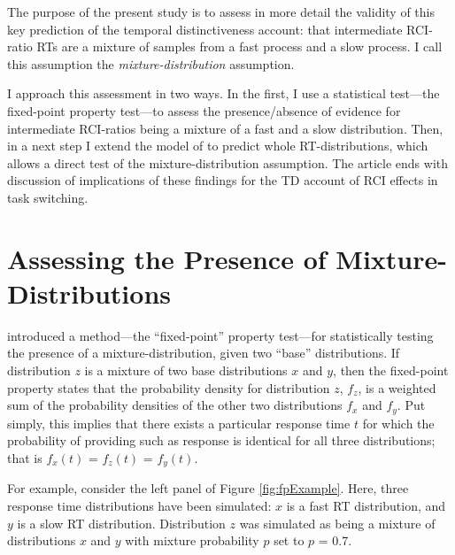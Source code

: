 \documentclass[a4paper, jou, natbib]{apa6}
\begin{document}
The purpose of the present study is to assess in more detail the validity of this key prediction of the temporal distinctiveness account: that intermediate RCI-ratio RTs are a mixture of samples from a fast process and a slow process. I call this assumption the \emph{mixture-distribution} assumption. 

I approach this assessment in two ways. In the first, I use a statistical test---the fixed-point property test---to assess the presence/absence of evidence for intermediate RCI-ratios being a mixture of a fast and a slow distribution. Then, in a next step I extend the model of \cite{Grange2015} to predict whole RT-distributions, which allows a direct test of the mixture-distribution assumption. The article ends with discussion of implications of these findings for the TD account of RCI effects in task switching.

\section{Assessing the Presence of Mixture-Distributions}
\cite{VanMaanen2014} introduced a method---the ``fixed-point'' property test---for statistically testing the presence of a mixture-distribution, given two ``base'' distributions. If distribution $z$ is a mixture of two base distributions $x$ and $y$, then the fixed-point property states that the probability density for distribution $z$, $f_{z}$, is a weighted sum of the probability densities of the other two distributions $f_{x}$ and $f_{y}$. Put simply, this implies that there exists a particular response time $t$ for which the probability of providing such as response is identical for all three distributions; that is $f_{x}(t)$ = $f_{z}(t)$ = $f_{y}(t)$. 

For example, consider the left panel of Figure \ref{fig:fpExample}. Here, three response time distributions have been simulated: $x$ is a fast RT distribution, and $y$ is a slow RT distribution. Distribution $z$ was simulated as being a mixture of distributions $x$ and $y$ with mixture probability $p$ set to $p$ = 0.7.  
\end{document}
